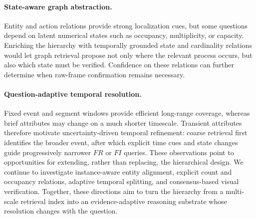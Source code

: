 \paragraph{State-aware graph abstraction.}
Entity and action relations provide strong localization cues, but some questions depend on latent numerical states such as occupancy, multiplicity, or capacity.
Enriching the hierarchy with temporally grounded state and cardinality relations would let graph retrieval propose not only where the relevant process occurs, but also which state must be verified.
Confidence on these relations can further determine when raw-frame confirmation remains necessary.

\paragraph{Question-adaptive temporal resolution.}
Fixed event and segment windows provide efficient long-range coverage, whereas brief attributes may change on a much shorter timescale.
Transient attributes therefore motivate uncertainty-driven temporal refinement: coarse retrieval first identifies the broader event, after which explicit time cues and state changes guide progressively narrower $FR$ or $FI$ queries.
These observations point to opportunities for extending, rather than replacing, the hierarchical design.
We continue to investigate instance-aware entity alignment, explicit count and occupancy relations, adaptive temporal splitting, and consensus-based visual verification.
Together, these directions aim to turn the hierarchy from a multi-scale retrieval index into an evidence-adaptive reasoning substrate whose resolution changes with the question.

